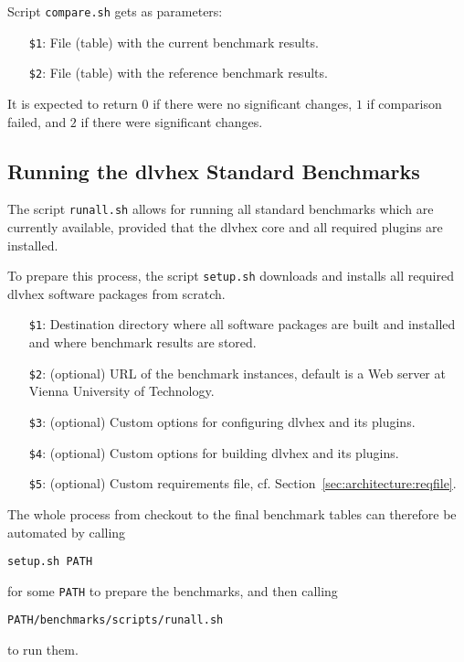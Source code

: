 \documentclass[a4paper]{article}
\newcommand{\dlvhex}{{\sc dlvhex}}
\begin{document}
			Script {\tt compare.sh} gets as parameters:
			    \begin{itemize}
					\item[{\tt \$1}:] File (table) with the current benchmark results.
					\item[{\tt \$2}:] File (table) with the reference benchmark results.
			    \end{itemize}
			
			It is expected to return $0$ if there were no significant changes,
			$1$ if comparison failed, and $2$ if there were significant changes.

		\subsection{Running the \dlvhex{} Standard Benchmarks}

			The script {\tt runall.sh} allows for
			running all standard benchmarks which are currently available,
			provided that the {\sc dlvhex} core and all required plugins are installed.

			To prepare this process, the script {\tt setup.sh} downloads and installs all required {\sc dlvhex} software packages
			from scratch.

			\medskip{}
			\begin{itemize}
				\item[{\tt \$1}:] Destination directory where all software packages are built and installed and where benchmark results are stored.
				\item[{\tt \$2}:] (optional) URL of the benchmark instances, default is a Web server at Vienna University of Technology.
				\item[{\tt \$3}:] (optional) Custom options for configuring {\sc dlvhex} and its plugins.
				\item[{\tt \$4}:] (optional) Custom options for building {\sc dlvhex} and its plugins.
				\item[{\tt \$5}:] (optional) Custom requirements file, cf. Section~\ref{sec:architecture:reqfile}.				
			\end{itemize}

			The whole process from checkout to the final benchmark tables can therefore be automated by calling
			\begin{center}
				{\tt setup.sh PATH}
			\end{center}
			for some {\tt PATH} to prepare the benchmarks, and then calling
			\begin{center}
				{\tt PATH/benchmarks/scripts/runall.sh}
			\end{center}
			to run them.
\end{document}
